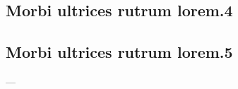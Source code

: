 \documentclass[
	12pt,									%
	openright,						    %
	oneside,							%
	a4paper,							%
	english,							%
	spanish,							%
	brazil,								%
	]{abntex2}
\begin{document}
%

\begin{apendicesenv}

\chapter{Morbi ultrices rutrum lorem.4}
\lipsum[30]


\end{apendicesenv}

\begin{anexosenv}
\partanexos

\chapter{Morbi ultrices rutrum lorem.5}
 ---
\lipsum[30]
\end{anexosenv}

\end{document}
